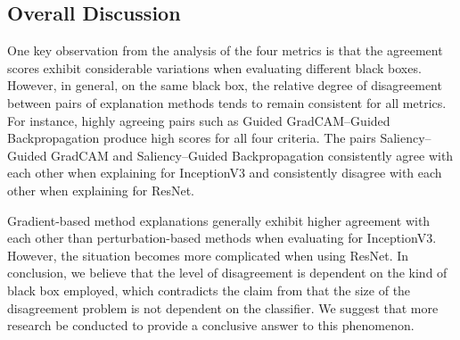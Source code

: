 \subsection{Overall Discussion}
One key observation from the analysis of the four metrics is that the agreement scores exhibit considerable variations when evaluating different black boxes. However, in general, on the same black box, the relative degree of disagreement between pairs of explanation methods tends to remain consistent for all metrics. For instance, highly agreeing pairs such as Guided GradCAM--Guided Backpropagation produce high scores for all four criteria. The pairs Saliency--Guided GradCAM and Saliency--Guided Backpropagation consistently agree with each other when explaining for InceptionV3 and consistently disagree with each other when explaining for ResNet.

Gradient-based method explanations generally exhibit higher agreement with each other than perturbation-based methods when evaluating for InceptionV3. However, the situation becomes more complicated when using ResNet. In conclusion, we believe that the level of disagreement is dependent on the kind of black box employed, which contradicts the claim from \cite{disagreementCounterfactual} that the size of the disagreement problem is not dependent on the classifier. We suggest that more research be conducted to provide a conclusive answer to this phenomenon.
